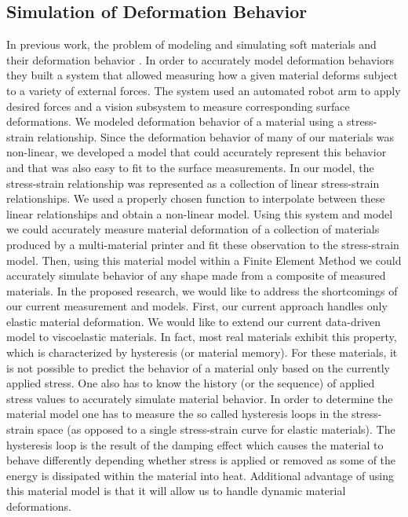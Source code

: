 \documentclass[annual]{acmsiggraph}
\begin{document}
\subsection{Simulation of Deformation Behavior}
In previous work, the problem
of modeling and simulating soft materials and their deformation behavior \cite{Bickel:2010,Bickel:2009}.
In order to accurately model deformation behaviors they built a system that allowed measuring how
a given material deforms subject to a variety of external forces. 
The system used an automated
robot arm to apply desired forces and a vision subsystem to measure corresponding surface deformations.
We modeled deformation behavior of a material using a stress-strain relationship. Since
the deformation behavior of many of our materials was non-linear, we developed a model that could
accurately represent this behavior and that was also easy to fit to the surface measurements. In
our model, the stress-strain relationship was represented as a collection of linear stress-strain relationships.
We used a properly chosen function to interpolate between these linear relationships
and obtain a non-linear model. Using this system and model we could accurately measure material
deformation of a collection of materials produced by a multi-material printer and fit these observation
to the stress-strain model. Then, using this material model within a Finite Element Method
we could accurately simulate behavior of any shape made from a composite of measured materials.
In the proposed research, we would like to address the shortcomings of our current measurement
and models. First, our current approach handles only elastic material deformation. We would like to
extend our current data-driven model to viscoelastic materials. In fact, most real materials exhibit
this property, which is characterized by hysteresis (or material memory). For these materials, it is
not possible to predict the behavior of a material only based on the currently applied stress. One also
has to know the history (or the sequence) of applied stress values to accurately simulate material
behavior. In order to determine the material model one has to measure the so called hysteresis
loops in the stress-strain space (as opposed to a single stress-strain curve for elastic materials). The
hysteresis loop is the result of the damping effect which causes the material to behave differently
depending whether stress is applied or removed as some of the energy is dissipated within the
material into heat. Additional advantage of using this material model is that it will allow us to
handle dynamic material deformations.
\end{document}
